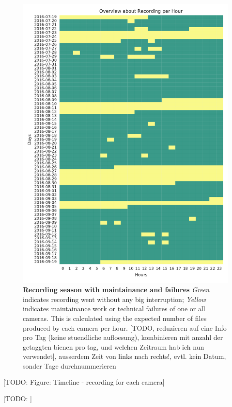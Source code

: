 \begin{figure}[htb]
	\centering
	\includegraphics[width=1.0\textwidth]{Figures/recording}
	\caption[Recording season with maintainance and failures]{\textbf{Recording season with maintainance and failures} \emph{Green} indicates recording went without any big interruption; \emph{Yellow} indicates maintainance work or technical failures of one or all cameras. This is calculated using the expected number of files produced by each camera per hour. [TODO, reduzieren auf eine Info pro Tag (keine stuendliche aufloesung), kombinieren mit anzahl der getaggten bienen pro tag, und welchen Zeitraum hab ich nun verwendet], ausserdem Zeit von links nach rechts!, evtl. kein Datum, sonder Tage durchnummerieren}
	\label{fig:observation-period}
\end{figure}

[TODO: Figure: Timeline - recording for each camera]

[TODO: ]